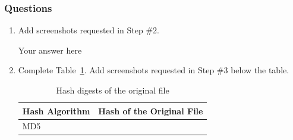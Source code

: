 \documentclass[11pt,letterpaper]{article}
\newenvironment{answer}{\em \color{blue} \begin{adjustwidth}{1cm}{1cm}}{\end{adjustwidth}}
\begin{document}
	\subsubsection*{Questions}
	\begin{enumerate}
		
		\item Add screenshots requested in Step \#2.
		
		\begin{answer}
			Your answer here
		\end{answer}
		
		
		
		\item Complete Table~\ref{tab:hash-digest-originalhashfile}. Add screenshots requested in Step \#3 below the table.
		
				
				
				
				
		
		\begin{table}[h!]
			\caption{Hash digests of the original file
			} \label{tab:hash-digest-originalhashfile}
			\begin{tabularx}{\columnwidth}{|p{4cm}|X|}
				\hline
				\textbf{Hash Algorithm} & \textbf{Hash of the Original File} \\
				\hline
				MD5 &  \\\hline
				

\end{tabularx}
\end{table}
\end{enumerate}
\end{document}

